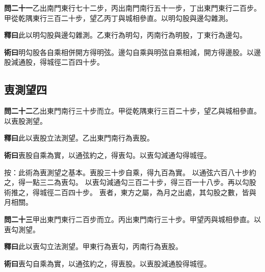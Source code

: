 \documentclass[12pt,a4paper]{article}
\newcommand{\Section}[1]{\subsection*{#1}}
\begin{document}
\vspace{0.5em}

\noindent\textbf{問二十一}\quad 乙出南門東行七十二步，丙出南門南行五十一步，丁出東門東行二百步。甲從乾隅東行三百二十步，望乙丙丁與城相參直。以明勾股與邊勾雜測。

\vspace{0.3em}

\noindent\textbf{釋曰}\quad 此以明勾股與邊勾雜測。乙東行為明勾，丙南行為明股，丁東行為邊勾。

\vspace{0.3em}

\noindent\textbf{術曰}\quad 明勾股各自乘相併開方得明弦。邊勾自乘與明弦自乘相減，開方得邊股。以邊股減通股，得城徑二百四十步。

\Section{叀測望四}

\noindent\textbf{問二十二}\quad 乙出東門南行三十步而立。甲從乾隅東行三百二十步，望乙與城相參直。以叀股測望。

\vspace{0.3em}

\noindent\textbf{釋曰}\quad 此以叀股立法測望。乙出東門南行為叀股。

\vspace{0.3em}

\noindent\textbf{術曰}\quad 叀股自乘為實，以通弦約之，得叀勾。以叀勾減通勾得城徑。

\vspace{0.3em}

\noindent
按：此術為叀測望之基本。叀股三十步自乘，得九百為實。
以通弦六百八十步約之，得一點三二為叀勾。
以叀勾減通勾三百二十步，得三百一十八步。再以勾股術推之，得城徑二百四十步。
叀者，東方之屬，為月之出處，其勾股之數，皆與月相關。

\vspace{0.5em}

\noindent\textbf{問二十三}\quad 甲出東門東行二百步而立。丙出東門南行三十步。甲望丙與城相參直。以叀勾測望。

\vspace{0.3em}

\noindent\textbf{釋曰}\quad 此以叀勾立法測望。甲東行為叀勾，丙南行為叀股。

\vspace{0.3em}

\noindent\textbf{術曰}\quad 叀勾自乘為實，以通弦約之，得叀股。以叀股減通股得城徑。
\end{document}
